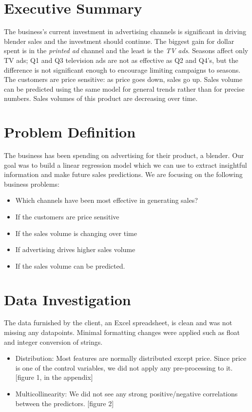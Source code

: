 \section{Executive Summary}

The business’s current investment in advertising channels is significant in driving blender sales and the investment should continue. The biggest gain for dollar spent is in the \emph{printed ad } channel and the least is the \emph{TV ads}. Seasons affect only TV ads; Q1 and Q3 television ads are not as effective as Q2 and Q4’s, but the difference is not significant enough to encourage limiting campaigns to seasons. The customers are price sensitive: as price goes down, sales go up. Sales volume can be predicted using the same model for general trends rather than for precise numbers. Sales volumes of this product are decreasing over time.

\section{Problem Definition}
The business has been spending on advertising for their product, a blender. Our goal was to build a linear regression model which we can use to extract insightful information and make future sales predictions. We are focusing on the following business problems:
\begin{itemize}
  \item Which channels have been most effective in generating sales?
  \item If the customers are price sensitive
  \item If the sales volume is changing over time
  \item If advertising drives higher sales volume
  \item If the sales volume can be predicted.
\end{itemize}

\section{Data Investigation}
The data furnished by the client, an Excel spreadsheet, is clean and was not missing any datapoints. Minimal formatting changes were applied such as float and integer conversion of strings.
\begin{itemize}
  \item Distribution: Most features are normally distributed except price. Since price is one of the control variables, we did not apply any pre-processing to it. [figure 1, in the appendix]
  \item Multicollinearity: We did not see any strong positive/negative correlations between the predictors. [figure 2]
\end{itemize}

